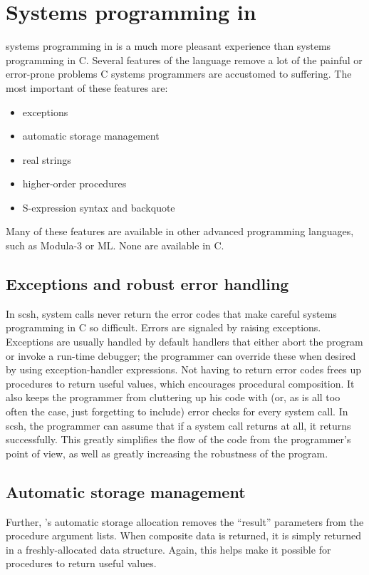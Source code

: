 \section{Systems programming in {\Scheme}}
\label{sec:scm-sysprog}
{\Unix} systems programming in {\Scheme} is a much more pleasant experience
than {\Unix} systems programming in C.
Several features of the language remove a lot of the painful or error-prone
problems C systems programmers are accustomed to suffering.
The most important of these features are:
\begin{itemize}
\item exceptions
\item automatic storage management
\item real strings
\item higher-order procedures
\item S-expression syntax and backquote
\end{itemize}
%
Many of these features are available in other advanced programming languages,
such as Modula-3 or ML. None are available in C.

\subsection{Exceptions and robust error handling}
In scsh, system calls never return the error codes that make careful
systems programming in C so difficult. Errors are signaled by raising
exceptions.
Exceptions are usually handled by default handlers that either abort the
program or invoke a run-time debugger; the programmer can override these when
desired by using exception-handler expressions.
Not having to return error codes frees up procedures to return useful values, 
which encourages procedural composition.
It also keeps the programmer from cluttering up his code with
(or, as is all too often the case, just forgetting to include)
error checks for every system call.
In scsh, the programmer can assume that if a system call returns at all, it
returns successfully.
This greatly simplifies the flow of the code from the programmer's point
of view, as well as greatly increasing the robustness of the program.

\subsection{Automatic storage management}
Further, {\Scheme}'s automatic storage allocation removes the
``result'' parameters from the procedure argument lists.
When composite data is returned, it is simply returned in a 
freshly-allocated data structure.
Again, this helps make it possible for procedures to return useful values.

